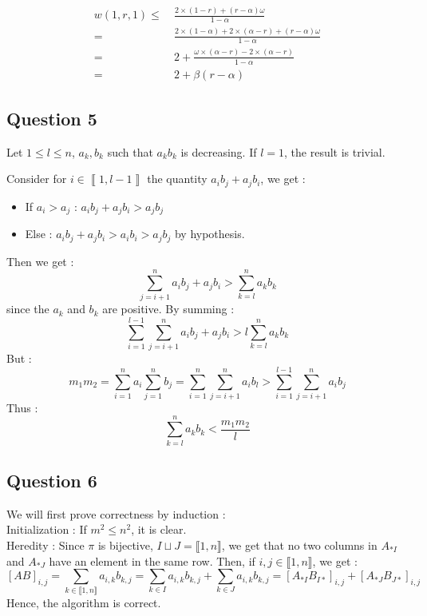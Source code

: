 \documentclass{cours}
\begin{document}
\begin{itemize}
\[\begin{aligned}
                        w(1, r, 1)  \leq &\ \frac{2 \times \left(1 - r\right) + \left(r - \alpha\right)\omega}{1 - \alpha}\\
                        = &\ \frac{2 \times \left(1 - \alpha\right) + 2 \times \left(\alpha - r\right) + \left(r - \alpha\right) \omega}{1 - \alpha}\\
                        = &\ 2 + \frac{\omega \times \left(\alpha - r\right) - 2 \times \left(\alpha - r\right)}{1 - \alpha}\\
                        = &\ 2 + \beta(r - \alpha)
                    \end{aligned}
                \]
            \end{itemize}
            
        \subsection{Question 5}
            Let $1 \leq l \leq n$, $a_{k}, b_{k}$ such that $a_{k}b_{k}$ is decreasing.
            If $l = 1$, the result is trivial. 
        
            Consider for $i \in \left\llbracket 1, l - 1\right\rrbracket$ the quantity $a_{i}b_{j} + a_{j}b_{i}$, we get :
            \begin{itemize}
                \item If $a_{i} > a_{j}$ : $a_{i}b_{j} + a_{j}b_{i} > a_{j}b_{j}$
                \item Else : $a_{i}b_{j} + a_{j}b_{i} > a_{i}b_{i} > a_{j}b_{j}$ by hypothesis.
            \end{itemize}

            Then we get : 
            \[\sum_{j = i + 1}^{n} a_{i}b_{j} + a_{j}b_{i} > \sum_{k = l}^{n} a_{k}b_{k}\] since the $a_{k}$ and $b_{k}$ are positive.
            By summing :  
            \[\sum_{i = 1}^{l -1}\sum_{j = i + 1}^{n} a_{i}b_{j} + a_{j}b_{i} > l\sum_{k = l}^{n} a_{k}b_{k}\]
            But : 
            \[m_{1}m_{2} = \sum_{i = 1}^{n}a_{i} \sum_{j = 1}^{n}b_{j} = \sum_{i = 1}^{n}\sum_{j = i + 1}^{n}a_{i}b_{l} > \sum_{i = 1}^{l - 1}\sum_{j = i + 1}^{n}a_{i}b_{j}\]
            Thus :
            \[\sum_{k = l}^{n} a_{k}b_{k} < \frac{m_{1}m_{2}}{l}\]

        \subsection{Question 6}
        We will first prove correctness by induction : \\
        Initialization : If $m^{2} \leq n^{2}$, it is clear.\\
        Heredity : Since $\pi$ is bijective, $I\sqcup J = \llbracket 1, n \rrbracket$, we get that no two columns in $A_{*I}$ and $A_{*J}$ have an element in the same row. Then, if $i, j \in \llbracket 1, n \rrbracket$, we get : 
        \[
            \left[AB\right]_{i, j} = \sum_{k\in \llbracket 1, n\rrbracket} a_{i, k}b_{k, j} = \sum_{k\in I}a_{i, k}b_{k,j} + \sum_{k \in J}a_{i,k}b_{k,j} = \left[A_{*I}B_{I*}\right]_{i, j} + \left[A_{*J}B_{J*}\right]_{i, j}
        \]
        Hence, the algorithm is correct.
\end{document}
